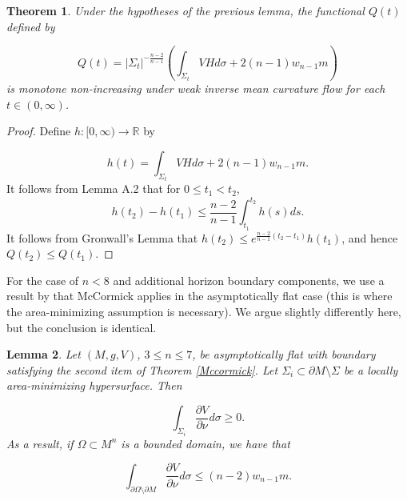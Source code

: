 \documentclass[12pt,twoside]{article}
\theoremstyle{plain}
\newtheorem{theorem}{Theorem}[section]
\newtheorem{lemma}[theorem]{Lemma}
\theoremstyle{definition}
\theoremstyle{remark}
\numberwithin{equation}{section}
\begin{document}
\begin{theorem} \label{monotone}
Under the hypotheses of the previous lemma, the functional $Q(t)$ defined by

\begin{equation}
    Q(t) = |\Sigma_{t}|^{-\frac{n-2}{n-1}} \left( \int_{\Sigma_{t}} VH d\sigma + 2(n-1) w_{n-1} m \right)
\end{equation}
is monotone non-increasing under weak inverse mean curvature flow for each $t \in (0,\infty)$.
\end{theorem}

\begin{proof}
Define $h: [0,\infty) \rightarrow \mathbb{R}$ by

\begin{equation*}
    h(t)= \int_{\Sigma_{t}} VHd\sigma + 2(n-1)w_{n-1}m.
\end{equation*}
It follows from Lemma A.2 that for $0 \leq t_{1} < t_{2}$, 
\begin{equation*}
    h(t_{2}) - h(t_{1}) \leq \frac{n-2}{n-1} \int_{t_{1}}^{t_{2}} h(s) ds.
\end{equation*}
It follows from Gronwall's Lemma that $h(t_{2}) \leq e^{\frac{n-2}{n-1} (t_{2}-t_{1})} h(t_{1})$, and hence $Q(t_{2}) \leq Q(t_{1})$.
\end{proof}
For the case of $n < 8$ and additional horizon boundary components, we use a result by \cite{HMM} that McCormick applies in the asymptotically flat case (this is where the area-minimizing assumption is necessary). We argue slightly differently here, but the conclusion is identical.
\begin{lemma} \label{extra_boundary}
Let $(M,g,V)$, $3 \leq n \leq 7$, be asymptotically flat  with boundary satisfying the second item of Theorem \ref{Mccormick}. Let $\Sigma_{i} \subset \partial M \setminus \Sigma$ be a locally area-minimizing hypersurface. Then

\begin{equation*}
    \int_{\Sigma_{i}} \frac{\partial V}{\partial \nu} d\sigma \geq 0.
\end{equation*}
As a result, if $\Omega \subset M^{n}$ is a bounded domain, we have that

\begin{equation} \label{m_upper_bound}
\int_{\partial \Omega \setminus \partial M} \frac{\partial V}{\partial \nu} d\sigma \leq (n-2) w_{n-1} m.
\end{equation}
\end{lemma}
\end{document}
